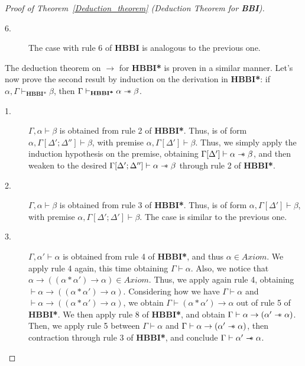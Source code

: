 \documentclass[a4paper]{article}
\newcommand\magicwand{\mathrel{-\mkern-6mu*}}
\newcommand{\BBI}{\textbf{BBI}\xspace}
\begin{document}
\begin{proof}[Proof of Theorem~\ref{Deduction_theorem} (Deduction Theorem for \BBI)]
\begin{description}
\item[6.] The case with rule 6 of \textbf{HBBI} is analogous to the previous one. 


        
    \end{description}
    
    The deduction theorem on $\rightarrow$ for \textbf{HBBI*} is proven in a similar manner. Let's now prove the second result by induction on the derivation in \textbf{HBBI*}: if $\alpha, \Gamma \vdash_{\textbf{HBBI*}} \beta$, then $\Gamma \vdash_{\textbf{HBBI*}} \alpha \magicwand \beta$. 

    \begin{description}


        \item[1.] $\Gamma ,\alpha\vdash \beta$ is obtained from rule 2 of \textbf{HBBI*}. Thus, is of form $\alpha, \Gamma[\Delta'; \Delta'']\vdash \beta$, with premise $\alpha, \Gamma[\Delta'] \vdash \beta$. Thus, we simply apply the induction hypothesis on the premise, obtaining $\Gamma[\Delta'] \vdash \alpha \magicwand \beta$, and then weaken to the desired $\Gamma[\Delta'; \Delta''] \vdash \alpha \magicwand \beta$ through rule 2 of \textbf{HBBI*}.
        
        
        
        
        
        
        
        
        \item[2.] $\Gamma ,\alpha\vdash \beta$ is obtained from rule 3 of \textbf{HBBI*}. Thus, is of form $\alpha, \Gamma[\Delta']\vdash \beta$, with premise $\alpha, \Gamma[\Delta'; \Delta'] \vdash \beta$. The case is similar to the previous one.


        \item[3.]  $\Gamma ,\alpha'\vdash \alpha$ is obtained from rule 4 of \textbf{HBBI*}, and thus $\alpha \in Axiom$. We apply rule 4 again, this time obtaining $\Gamma \vdash \alpha$. Also, we notice that $\alpha \rightarrow ((\alpha*\alpha')\rightarrow \alpha) \in Axiom$. Thus, we apply again rule 4, obtaining $\vdash \alpha \rightarrow ((\alpha*\alpha')\rightarrow \alpha)$. Considering how we have $\Gamma \vdash \alpha$ and $\vdash\alpha \rightarrow ((\alpha*\alpha')\rightarrow \alpha)$, we obtain $\Gamma \vdash (\alpha * \alpha') \rightarrow \alpha$ out of rule 5 of \textbf{HBBI*}. We then apply rule 8 of \textbf{HBBI*}, and obtain $\Gamma \vdash \alpha \rightarrow (\alpha' \magicwand \alpha)$. Then, we apply rule 5 between $\Gamma\vdash \alpha$ and $\Gamma \vdash \alpha \rightarrow (\alpha' \magicwand \alpha)$, then contraction through rule 3 of \textbf{HBBI*}, and conclude $\Gamma \vdash \alpha' \magicwand \alpha$. 
        

\end{description}
\end{proof}
\end{document}
